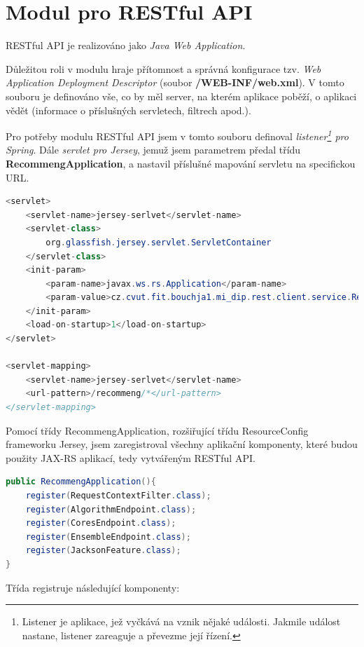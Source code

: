 \documentclass[thesis=M,czech]{FITthesis}[2014/05/07]
\begin{document}
\section{Modul pro RESTful API}
\label{sub:restapi}

RESTful API je realizováno jako \emph{Java Web Application}.

Důležitou roli v modulu hraje přítomnost a správná konfigurace tzv. \emph{Web Application Deployment Descriptor} (soubor \textbf{/WEB-INF/web.xml}). V tomto souboru je definováno vše, co by měl server, na kterém aplikace poběží, o aplikaci vědět (informace o příslušných servletech, filtrech apod.).

Pro potřeby modulu RESTful API jsem v tomto souboru definoval \emph{listener\footnote{Listener je aplikace, jež vyčkává na vznik nějaké události. Jakmile událost nastane, listener zareaguje a převezme její řízení.} pro Spring}. Dále \emph{servlet pro Jersey}, jemuž jsem parametrem předal třídu \textbf{RecommengApplication}, a nastavil příslušné mapování servletu na specifickou URL.

\begin{lstlisting}[language=java]
<servlet>
    <servlet-name>jersey-serlvet</servlet-name>
    <servlet-class>
        org.glassfish.jersey.servlet.ServletContainer
    </servlet-class>
    <init-param>
        <param-name>javax.ws.rs.Application</param-name>
        <param-value>cz.cvut.fit.bouchja1.mi_dip.rest.client.service.RecommengApplication</param-value>            
    </init-param>        
    <load-on-startup>1</load-on-startup>
</servlet>

<servlet-mapping>
    <servlet-name>jersey-serlvet</servlet-name>
    <url-pattern>/recommeng/*</url-pattern>
</servlet-mapping>
\end{lstlisting}

Pomocí třídy RecommengApplication, rozšiřující třídu ResourceConfig frameworku Jersey, jsem zaregistroval všechny aplikační komponenty, které budou použity JAX-RS aplikací, tedy vytvářeným RESTful API.

\begin{lstlisting}[language=java]
public RecommengApplication(){
    register(RequestContextFilter.class);
    register(AlgorithmEndpoint.class);
    register(CoresEndpoint.class);
    register(EnsembleEndpoint.class);
    register(JacksonFeature.class);        
}
\end{lstlisting}

Třída registruje následující komponenty:
\end{document}
